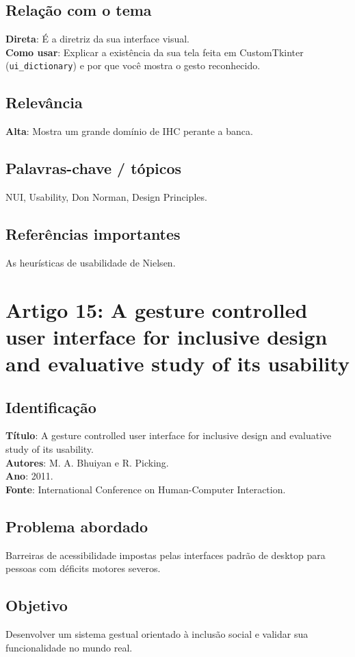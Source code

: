 \documentclass[12pt, a4paper]{article}
\begin{document}
\subsection{Relação com o tema}
\textbf{Direta}: É a diretriz da sua interface visual.\\
\textbf{Como usar}: Explicar a existência da sua tela feita em CustomTkinter (\texttt{ui\_dictionary}) e por que você mostra o gesto reconhecido.\\
\subsection{Relevância}
\textbf{Alta}: Mostra um grande domínio de IHC perante a banca.\\
\subsection{Palavras-chave / tópicos}
NUI, Usability, Don Norman, Design Principles.\\
\subsection{Referências importantes}
As heurísticas de usabilidade de Nielsen.
\newpage

\section{Artigo 15: A gesture controlled user interface for inclusive design and evaluative study of its usability}
\subsection{Identificação}
\textbf{Título}: A gesture controlled user interface for inclusive design and evaluative study of its usability.\\
\textbf{Autores}: M. A. Bhuiyan e R. Picking.\\
\textbf{Ano}: 2011.\\
\textbf{Fonte}: International Conference on Human-Computer Interaction.\\
\subsection{Problema abordado}
Barreiras de acessibilidade impostas pelas interfaces padrão de desktop para pessoas com déficits motores severos.\\
\subsection{Objetivo}
Desenvolver um sistema gestual orientado à inclusão social e validar sua funcionalidade no mundo real.\\
\end{document}
